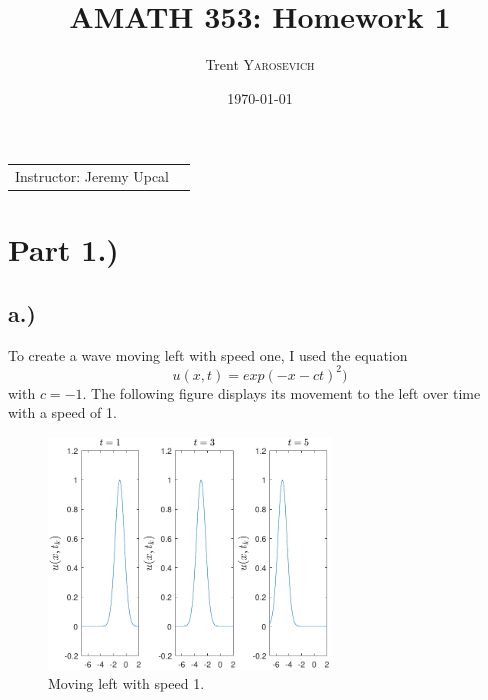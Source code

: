 \documentclass{article}
\title{AMATH 353: Homework 1} %
\author{Trent \textsc{Yarosevich}} %
\date{\today} %
\begin{document}
\maketitle %
\setlength\parindent{1cm}

\begin{center}
\begin{tabular}{l r}
Instructor: Jeremy Upcal %
\end{tabular}
\end{center}



\section*{Part 1.)}
\subsection*{a.)}
To create a wave moving left with speed one, I used the equation 
\begin{equation}
u(x,t) = exp(-x - ct)^2) 
\end{equation}
with $c = -1$. The following figure displays its movement to the left over time with a speed of 1.
\begin{figure}[H]
\centering
    \includegraphics[width=75mm, scale=.8]{plot_1a.pdf}
	\caption{Moving left with speed 1.}
\end{figure}
\end{document}
